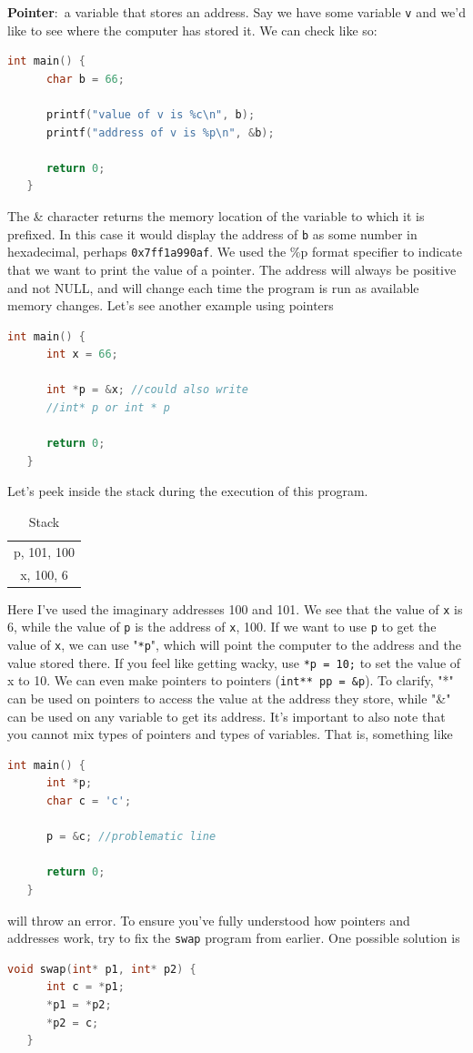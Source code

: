\documentclass[nobib]{tufte-handout}
\newcommand{\defn}[2]{\noindent\textbf{#1}:\ #2}
\begin{document}
\defn{Pointer}{a variable that stores an address}. Say we have some variable \texttt{v}
and we'd like to see where the computer has stored it. We can check like so:
\begin{lstlisting}[language=C,caption=Pointers]
   int main() {
      char b = 66;

      printf("value of v is %c\n", b);
      printf("address of v is %p\n", &b);

      return 0;
   }
\end{lstlisting}
The \& character returns the memory location of the variable to which
it is prefixed. In this case it would display the address of \texttt{b}
as some number in hexadecimal, perhaps \texttt{0x7ff1a990af}. We used the 
\%p format specifier to indicate that we want to print the value of a pointer.
The address will always be positive and not NULL, and will change each time
the program is run as available memory changes. 
Let's see another example using pointers
\begin{lstlisting}[language=C,caption=Pointers pt. 2]
   int main() {
      int x = 66;

      int *p = &x; //could also write 
      //int* p or int * p

      return 0;
   }
\end{lstlisting}
Let's peek inside the stack during the execution of this program. 
\begin{table}[h]
   \centering
   \caption{Stack}
   \label{table:scopestack}
   \begin{tabular}{|c|}
   \hline
   p, 101, 100 \\
   x, 100, 6 \\
   \hline
   \end{tabular}
\end{table}
Here I've used the imaginary addresses 100 and 101. We see that the 
value of \texttt{x} is 6, while the value of \texttt{p} is the 
address of \texttt{x}, 100. If we want to use \texttt{p} to get the value of 
\texttt{x}, we can use "\texttt{*p}", which will point the computer
to the address and the value stored there. If you feel like 
getting wacky, use \texttt{*p = 10;} to set the value of x to 10. 
We can even make pointers to pointers (\texttt{int** pp = \&p}).
To clarify, "*" can be used on 
pointers to access the value at the address they store, while "\&" can 
be used on any variable to get its address. It's important to also note 
that you cannot mix types of pointers and types of variables. That is, 
something like 
\begin{lstlisting}[language=C,caption=Type error]
   int main() {
      int *p;
      char c = 'c';

      p = &c; //problematic line

      return 0;
   }
\end{lstlisting}
will throw an error. To ensure you've fully understood how pointers and addresses 
work, try to fix the \texttt{swap} program from earlier. One possible solution is 
\begin{lstlisting}[language=C,caption=Corrected swap]
   void swap(int* p1, int* p2) {
      int c = *p1;
      *p1 = *p2;
      *p2 = c;
   }
\end{lstlisting}
\end{document}
